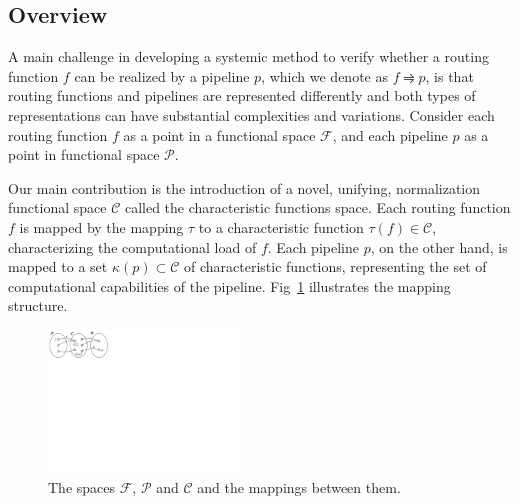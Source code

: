 \subsection{Overview}
A main challenge in developing a systemic method to verify whether a routing function $f$ can be realized by a pipeline $p$, which we denote as $f \rightrightharpoons p$, is that routing functions and pipelines are represented differently and both types of representations can have substantial complexities and variations. Consider each routing function $f$ as a point in a functional space $\mathcal{F}$, and each pipeline $p$ as a point in functional space $\mathcal{P}$. 

Our main contribution is the introduction of a novel, unifying, normalization functional space $\mathcal{C}$ called the characteristic functions space. Each routing function $f$ is mapped by the mapping $\tau$ to a characteristic function $\tau(f) \in \mathcal{C}$, characterizing the computational load of $f$. Each pipeline $p$, on the other hand, is mapped to a set $\kappa(p) \subset \mathcal{C}$ of characteristic functions, representing the set of computational capabilities of the pipeline. 
Fig~\ref{fig:function-spaces} illustrates the mapping structure.


\begin{figure}[tbh]
    \centering
    \vspace{-1mm}
    \includegraphics[clip, trim=0in 8.5in 9.8in 0in, width=2in]{figures/function-spaces.pdf}
    \vspace{-2mm}
    \caption{The spaces $\mathcal{F}$, $\mathcal{P}$ and $\mathcal{C}$ and the mappings between them.}
    \label{fig:function-spaces}
    \vspace{-2mm}
\end{figure}

